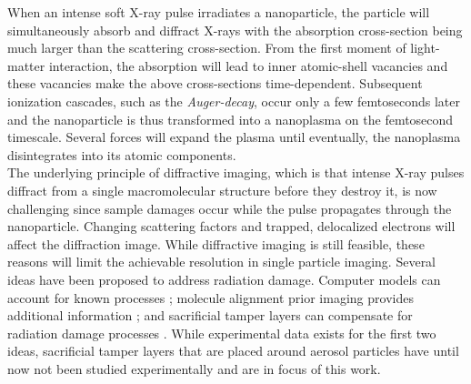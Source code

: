 When an intense soft X-ray pulse irradiates a nanoparticle, the particle will simultaneously absorb and diffract X-rays with the absorption cross-section being much larger than the scattering cross-section. From the first moment of light-matter interaction, the absorption will lead to inner atomic-shell vacancies \citep{Young-2010-Nature} and these vacancies make the above cross-sections time-dependent. Subsequent ionization cascades, such as the \textit{Auger-decay}, occur only a few femtoseconds later and the nanoparticle is thus transformed into a nanoplasma on the femtosecond timescale. Several forces will expand the plasma \citep{Gorkhover-2016-NatPho} until eventually, the nanoplasma disintegrates into its atomic components.\\[1\baselineskip]
%
The underlying principle of diffractive imaging, which is that intense X-ray pulses diffract from a single macromolecular structure before they destroy it, is now challenging since sample damages occur while the pulse propagates through the nanoparticle. Changing scattering factors and trapped, delocalized electrons will affect the diffraction image. While diffractive imaging is still feasible, these reasons will limit the achievable resolution in single particle imaging. Several ideas have been proposed to address radiation damage. Computer models can account for known processes \citep{Quiney-2010-NatPhys}; molecule alignment prior imaging provides additional information \citep{Kupper-2014-PRL}; and sacrificial tamper layers can compensate for radiation damage processes \citep{Hau-Riege-2004-PRE,Hau-Riege-2010-PRL}. While experimental data exists for the first two ideas, sacrificial tamper layers that are placed around aerosol particles have until now not been studied experimentally and are in focus of this work.\\[1\baselineskip]
